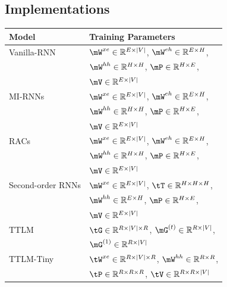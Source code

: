 \subsection{Implementations}
\label{sec:implementations}


\begin{table}[ht] \small
    \centering
    \begin{tabular}{ll}
    \toprule
        Model & Training Parameters \\
        \midrule
        Vanilla-RNN & $\mW^{xe}\in \mathbb{R}^{E\times |V|}$, $\mW^{eh}\in \mathbb{R}^{E\times H}$, \\ 
        & $\mW^{hh}\in \mathbb{R}^{H\times H}$, $\mP\in\mathbb{R}^{H\times E}$, \\
        & $\mV\in\mathbb{R}^{E\times|V|}$  \\
        \hline
        MI-RNNs & $\mW^{xe}\in \mathbb{R}^{E\times |V|}$, $\mW^{eh}\in \mathbb{R}^{E\times H}$, \\ 
        & $\mW^{hh}\in \mathbb{R}^{H\times H}$, $\mP\in\mathbb{R}^{H\times E}$, \\
        & $\mV\in\mathbb{R}^{E\times|V|}$  \\
       
        \hline
        RACs & $\mW^{xe}\in \mathbb{R}^{E\times |V|}$, $\mW^{eh}\in \mathbb{R}^{E\times H}$, \\
        & $\mW^{hh}\in \mathbb{R}^{H\times H}$, $\mP\in\mathbb{R}^{H\times E}$, \\
        & $\mV\in\mathbb{R}^{E\times|V|}$\\
        \hline
        Second-order RNNs & $\mW^{xe} \in \mathbb{R}^{E\times |V|}$, $\tT \in \mathbb{R}^{H\times H \times H}$, \\         
        & $\mW^{hh}\in \mathbb{R}^{E \times H}$, $\mP\in\mathbb{R}^{H\times E}$, \\
        & $\mV\in\mathbb{R}^{E\times|V|}$ \\
        \hline
        TTLM & $\tG\in \mathbb{R}^{R\times |V|\times R}$, $\mG^{(t)}\in \mathbb{R}^{R \times |V|}$, \\ 
        
        & $\mG^{(1)} \in \mathbb{R}^{R \times |V|}$ \\
        \hline
        TTLM-Tiny & $\tW^{xe}\in \mathbb{R}^{R\times |V| \times R}$, $\mW^{hh}\in\mathbb{R}^{R\times R}$, \\
        & $\tP\in\mathbb{R}^{R\times R\times R}$, $\tV\in\mathbb{R}^{R\times R\times |V|}$\\
        

\end{tabular}
\end{table}
